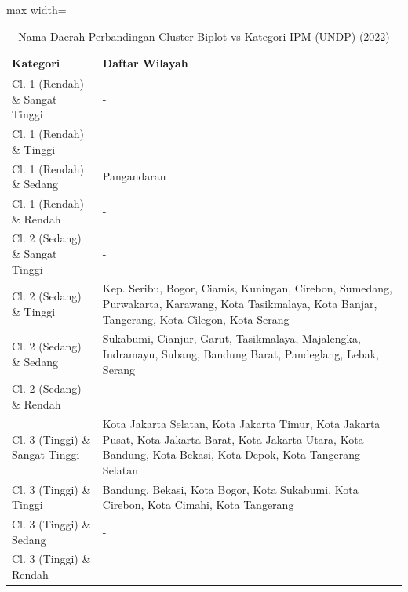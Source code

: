 \begin{table}[H]
\centering
\caption{Nama Daerah Perbandingan Cluster Biplot vs Kategori IPM (UNDP) (2022)} \label{tab:appcrossname2022}
\begin{adjustbox}{max width=\textwidth}
\begin{tabular}{|p{4cm}|p{10cm}|}
\hline
\textbf{Kategori} & \textbf{Daftar Wilayah} \\
\hline
Cl. 1 (Rendah) \& Sangat Tinggi & - \\
\hline
Cl. 1 (Rendah) \& Tinggi & - \\
\hline
Cl. 1 (Rendah) \& Sedang & Pangandaran \\
\hline
Cl. 1 (Rendah) \& Rendah & - \\
\hline
Cl. 2 (Sedang) \& Sangat Tinggi & - \\
\hline
Cl. 2 (Sedang) \& Tinggi & Kep. Seribu, Bogor, Ciamis, Kuningan, Cirebon, Sumedang, Purwakarta, Karawang, Kota Tasikmalaya, Kota Banjar, Tangerang, Kota Cilegon, Kota Serang \\
\hline
Cl. 2 (Sedang) \& Sedang & Sukabumi, Cianjur, Garut, Tasikmalaya, Majalengka, Indramayu, Subang, Bandung Barat, Pandeglang, Lebak, Serang \\
\hline
Cl. 2 (Sedang) \& Rendah & - \\
\hline
Cl. 3 (Tinggi) \& Sangat Tinggi & Kota Jakarta Selatan, Kota Jakarta Timur, Kota Jakarta Pusat, Kota Jakarta Barat, Kota Jakarta Utara, Kota Bandung, Kota Bekasi, Kota Depok, Kota Tangerang Selatan \\
\hline
Cl. 3 (Tinggi) \& Tinggi & Bandung, Bekasi, Kota Bogor, Kota Sukabumi, Kota Cirebon, Kota Cimahi, Kota Tangerang \\
\hline
Cl. 3 (Tinggi) \& Sedang & - \\
\hline
Cl. 3 (Tinggi) \& Rendah & - \\
\hline
\end{tabular}
\end{adjustbox}
\end{table}